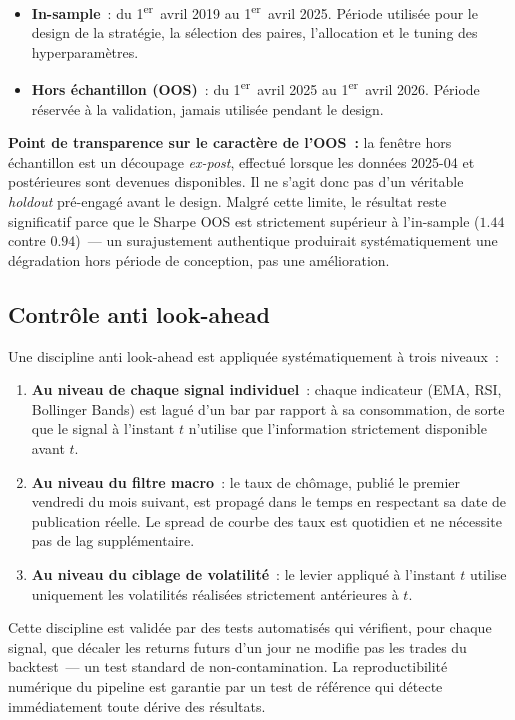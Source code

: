 \begin{itemize}
\item \textbf{In-sample}~: du 1\textsuperscript{er}~avril 2019 au 1\textsuperscript{er}~avril 2025. Période utilisée pour le design de la stratégie, la sélection des paires, l'allocation et le tuning des hyperparamètres.
\item \textbf{Hors échantillon (OOS)}~: du 1\textsuperscript{er}~avril 2025 au 1\textsuperscript{er}~avril 2026. Période réservée à la validation, jamais utilisée pendant le design.
\end{itemize}

\begin{warningbox}
\textbf{Point de transparence sur le caractère de l'OOS~:} la fenêtre hors échantillon est un découpage \emph{ex-post}, effectué lorsque les données 2025-04 et postérieures sont devenues disponibles. Il ne s'agit donc pas d'un véritable \emph{holdout} pré-engagé avant le design. Malgré cette limite, le résultat reste significatif parce que le Sharpe OOS est strictement supérieur à l'in-sample ($1.44$ contre $0.94$)~--- un surajustement authentique produirait systématiquement une dégradation hors période de conception, pas une amélioration.
\end{warningbox}

\subsection{Contrôle anti look-ahead}

Une discipline anti look-ahead est appliquée systématiquement à trois niveaux~:

\begin{enumerate}
\item \textbf{Au niveau de chaque signal individuel}~: chaque indicateur (EMA, RSI, Bollinger Bands) est lagué d'un bar par rapport à sa consommation, de sorte que le signal à l'instant $t$ n'utilise que l'information strictement disponible avant $t$.
\item \textbf{Au niveau du filtre macro}~: le taux de chômage, publié le premier vendredi du mois suivant, est propagé dans le temps en respectant sa date de publication réelle. Le spread de courbe des taux est quotidien et ne nécessite pas de lag supplémentaire.
\item \textbf{Au niveau du ciblage de volatilité}~: le levier appliqué à l'instant $t$ utilise uniquement les volatilités réalisées strictement antérieures à $t$.
\end{enumerate}

Cette discipline est validée par des tests automatisés qui vérifient, pour chaque signal, que décaler les returns futurs d'un jour ne modifie pas les trades du backtest~--- un test standard de non-contamination. La reproductibilité numérique du pipeline est garantie par un test de référence qui détecte immédiatement toute dérive des résultats.

